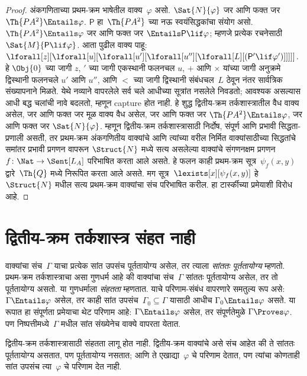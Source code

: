 \begin{proof}

अंकगणिताच्या प्रथम-क्रम भाषेतील वाक्य~$\varphi$ असो.
$\Sat{N}{\varphi}$ जर आणि फक्त जर $\Th{PA^2} \Entails \varphi$.
$\mathsf{P}$ हा~$\Th{PA^2}$ च्या नऊ स्वयंसिद्धकांचा संयोग असो.
$\Th{PA^2} \Entails \varphi$ जर आणि फक्त जर
$\Entails \mathsf{P} \lif \varphi$; म्हणजे प्रत्येक रचनेसाठी
$\Sat{M}{\mathsf{P} \lif \varphi}$. आता पुढील वाक्य पाहू:
$\lforall[z][\lforall[u][\lforall[u'][\lforall[u''][\lforall[L][(\mathsf{P}' \lif \varphi')]]]]]$.
हे $\Obj{0}$ च्या जागी $z$, $\prime$ च्या जागी
एकस्थानी फलनचल $u$, $+$ आणि $\times$ यांच्या जागी
अनुक्रमे द्विस्थानी फलनचले $u'$ आणि $u''$,
आणि $<$ च्या जागी द्विस्थानी संबंधचल~$L$ ठेवून
नंतर सार्वत्रिक संख्यापनाने मिळते. येथे नव्याने वापरलेले
सर्व चले आधीच्या सूत्रांत नसलेले निवडतो; आवश्यक असल्यास
आधी बद्ध चलांची नावे बदलतो, म्हणून capture होत नाही. हे शुद्ध द्वितीय-क्रम
तर्कशास्त्रातील वैध वाक्य असेल, जर आणि फक्त जर मूळ
वाक्य वैध असेल, जर आणि फक्त जर
$\Th{PA^2} \Entails \varphi$, जर आणि फक्त जर
$\Sat{N}{\varphi}$. म्हणून द्वितीय-क्रम तर्कशास्त्रासाठी
निर्दोष, संपूर्ण आणि प्रभावी सिद्धता-प्रणाली असती, तर
प्रथम-क्रम अंकगणितीय वाक्यांचे आणि त्यांच्या वरील निर्मित
वाक्यांसाठीच्या सिद्धतांचे समांतर प्रभावी प्रगणन वापरून
$\Struct{N}$ मध्ये सत्य असलेल्या वाक्यांचे
संगणनक्षम प्रगणन $f\colon \Nat \to \Sent[L_A]$
परिभाषित करता आले असते. हे फलन काही प्रथम-क्रम
सूत्र~$\psi_f(x, y)$ द्वारे~$\Th{Q}$ मध्ये निरूपित
करता आले असते. मग सूत्र~$\lexists[x][\psi_f(x, y)]$
हे~$\Struct{N}$ मधील सत्य प्रथम-क्रम वाक्यांचा संच
परिभाषित करील. हा टार्स्कीच्या प्रमेयाशी विरोध आहे.
\end{proof}














\section{द्वितीय-क्रम तर्कशास्त्र संहत नाही}\label{sol:met:com:sec}

\begin{explain}
वाक्यांचा संच~$\Gamma$ याचा प्रत्येक सांत उपसंच
पूर्ततायोग्य असेल, तर त्याला \emph{सांततः पूर्ततायोग्य}
म्हणतो. प्रथम-क्रम तर्कशास्त्राचा असा गुणधर्म आहे की
वाक्यांचा संच~$\Gamma$ सांततः पूर्ततायोग्य
असेल, तर तो पूर्ततायोग्य असतो. या गुणधर्माला
\emph{संहतता} म्हणतात. याचे परिणाम-संबंध वापरणारे
समतुल्य रूप असे: $\Gamma \Entails \varphi$ असेल,
तर काही सांत उपसंच~$\Gamma_0 \subseteq \Gamma$
यासाठी आधीच $\Gamma_0 \Entails
\varphi$ असते. या रूपात हा संपूर्णता प्रमेयाचा थेट
परिणाम आहे: $\Gamma \Entails \varphi$ असेल, तर
संपूर्णतेमुळे $\Gamma \Proves \varphi$. पण
निष्पत्तीमध्ये~$\Gamma$ मधील सांत
संख्येनेच वाक्ये वापरता येतात.

द्वितीय-क्रम तर्कशास्त्रासाठी संहतता लागू होत नाही.
द्वितीय-क्रम वाक्यांचे असे संच आहेत की ते
सांततः पूर्ततायोग्य असतात, पण पूर्ततायोग्य नसतात;
आणि ते एखाद्या~$\varphi$ चे परिणाम देतात, पण त्यांचा
कोणताही सांत उपसंच त्या~$\varphi$ चे परिणाम देत नाही.
\end{explain}


